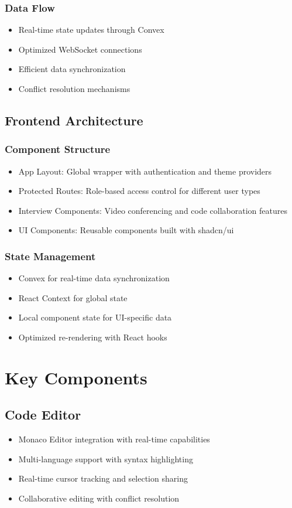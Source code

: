 \documentclass[12pt,a4paper]{report}
\begin{document}
\subsubsection{Data Flow}
\begin{itemize}
   \item Real-time state updates through Convex
   \item Optimized WebSocket connections
   \item Efficient data synchronization
   \item Conflict resolution mechanisms
\end{itemize}

\subsection{Frontend Architecture}
\subsubsection{Component Structure}
\begin{itemize}
   \item App Layout: Global wrapper with authentication and theme providers
   \item Protected Routes: Role-based access control for different user types
   \item Interview Components: Video conferencing and code collaboration features
   \item UI Components: Reusable components built with shadcn/ui
\end{itemize}

\subsubsection{State Management}
\begin{itemize}
   \item Convex for real-time data synchronization
   \item React Context for global state
   \item Local component state for UI-specific data
   \item Optimized re-rendering with React hooks
\end{itemize}

\section{Key Components}

\subsection{Code Editor}
\begin{itemize}
   \item Monaco Editor integration with real-time capabilities
   \item Multi-language support with syntax highlighting
   \item Real-time cursor tracking and selection sharing
   \item Collaborative editing with conflict resolution
\end{itemize}
\end{document}
